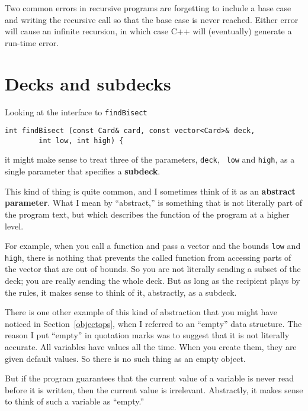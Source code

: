 Two common errors in recursive programs are forgetting to include a
base case and writing the recursive call so that the base case is never
reached.  Either error will cause an infinite recursion, in which case
C++ will (eventually) generate a run-time error.


\section{Decks and subdecks}

Looking at the interface to {\tt findBisect}

\begin{lstlisting}
int findBisect (const Card& card, const vector<Card>& deck,
		int low, int high) {
\end{lstlisting}
%
it might make sense to treat three of the parameters, {\tt deck}, {\tt
low} and {\tt high}, as a single parameter that specifies a {\bf
subdeck}.


This kind of thing is quite common, and I sometimes think of it as an
{\bf abstract parameter}.  What I mean by ``abstract,'' is something
that is not literally part of the program text, but which describes the
function of the program at a higher level.

For example, when you call a function and pass a vector and the bounds
{\tt low} and {\tt high}, there is nothing that prevents the called
function from accessing parts of the vector that are out of bounds.  So
you are not literally sending a subset of the deck; you are really
sending the whole deck.  But as long as the recipient plays by the
rules, it makes sense to think of it, abstractly, as a subdeck.

There is one other example of this kind of abstraction that you might
have noticed in Section~\ref{objectops}, when I referred to an
``empty'' data structure.  The reason I put ``empty'' in quotation
marks was to suggest that it is not literally accurate.  All variables
have values all the time.  When you create them, they are given
default values.  So there is no such thing as an empty object.

But if the program guarantees that the current value of a variable is
never read before it is written, then the current value is irrelevant.
Abstractly, it makes sense to think of such a variable as ``empty.''

